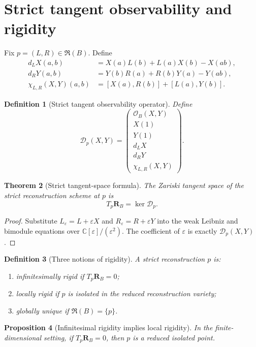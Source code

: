 \documentclass[11pt]{amsart}
\newtheorem{theorem}{Theorem}[section]
\newtheorem{proposition}[theorem]{Proposition}
\newtheorem{definition}[theorem]{Definition}
\newcommand{\Rfib}{\mathfrak R}
\newcommand{\cO}{\mathcal O}
\newcommand{\cD}{\mathscr D}
\newcommand{\C}{\mathbb C}
\begin{document}
\section{Strict tangent observability and rigidity}

Fix $p=(L,R)\in\Rfib(B)$.  Define
\begin{align*}
d_LX(a,b)&=X(a)L(b)+L(a)X(b)-X(ab),\\
d_RY(a,b)&=Y(b)R(a)+R(b)Y(a)-Y(ab),\\
\chi_{L,R}(X,Y)(a,b)&=[X(a),R(b)]+[L(a),Y(b)].
\end{align*}

\begin{definition}[Strict tangent observability operator]
Define
\[
\cD_p(X,Y)=
\begin{pmatrix}
\cO_B(X,Y)\\
X(1)\\
Y(1)\\
d_LX\\
d_RY\\
\chi_{L,R}(X,Y)
\end{pmatrix}.
\]
\end{definition}

\begin{theorem}[Strict tangent-space formula]\label{thm:tangent-formula}
The Zariski tangent space of the strict reconstruction scheme at $p$ is
\[
T_p\mathbf R_B=\ker\cD_p.
\]
\end{theorem}

\begin{proof}
Substitute $L_\varepsilon=L+\varepsilon X$ and $R_\varepsilon=R+\varepsilon Y$ into the weak Leibniz and bimodule equations over $\C[\varepsilon]/(\varepsilon^2)$.  The coefficient of $\varepsilon$ is exactly $\cD_p(X,Y)$.
\end{proof}

\begin{definition}[Three notions of rigidity]
A strict reconstruction $p$ is:
\begin{enumerate}[label=(\roman*)]
\item \emph{infinitesimally rigid} if $T_p\mathbf R_B=0$;
\item \emph{locally rigid} if $p$ is isolated in the reduced reconstruction variety;
\item \emph{globally unique} if $\Rfib(B)=\{p\}$.
\end{enumerate}
\end{definition}

\begin{proposition}[Infinitesimal rigidity implies local rigidity]\label{prop:inf-local}
In the finite-dimensional setting, if $T_p\mathbf R_B=0$, then $p$ is a reduced isolated point.
\end{proposition}
\end{document}
